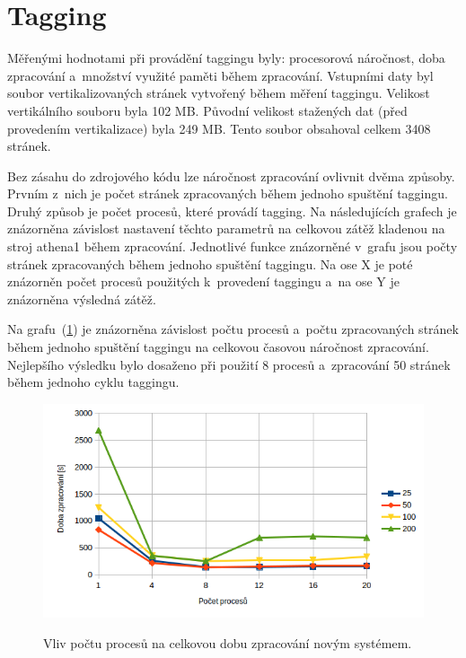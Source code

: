 \section{Tagging}
Měřenými hodnotami při provádění taggingu byly: procesorová náročnost, doba zpracování
a~množství využité paměti během zpracování. Vstupními daty byl soubor vertikalizovaných stránek
vytvořený během měření taggingu. Velikost vertikálního souboru byla 102 MB. Původní velikost
stažených dat (před provedením vertikalizace) byla 249 MB. Tento soubor obsahoval celkem
3408 stránek.

Bez zásahu do zdrojového kódu lze náročnost zpracování ovlivnit dvěma způsoby.
Prvním z~nich je počet stránek zpracovaných během jednoho spuštění taggingu. Druhý způsob
je počet procesů, které provádí tagging. Na následujících grafech je znázorněna závislost
nastavení těchto parametrů na celkovou zátěž kladenou na stroj athena1 během zpracování.
Jednotlivé funkce znázorněné v~grafu jsou počty stránek zpracovaných během jednoho spuštění
taggingu. Na ose X je poté znázorněn počet procesů použitých k~provedení taggingu a~na
ose Y je znázorněna výsledná zátěž.

Na grafu~(\ref{graph:graph_tagging_doba_zpracovani}) je znázorněna závislost počtu procesů
a~počtu zpracovaných stránek během jednoho spuštění taggingu na celkovou časovou náročnost
zpracování. Nejlepšího výsledku bylo dosaženo při použití 8 procesů a~zpracování 50
stránek během jednoho cyklu taggingu.

\begin{figure}[H]
    \begin{center}
        \label{graph:graph_tagging_doba_zpracovani}
        \includegraphics[width=1.0\textwidth]{obrazky-figures/graph_tagging_doba_zpracovani.png}
        \caption{Vliv počtu procesů na celkovou dobu zpracování novým systémem.}
    \end{center}
\end{figure}

